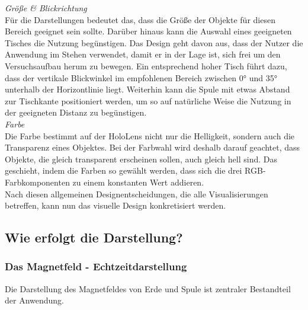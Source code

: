 \textit{Größe \& Blickrichtung}\\
Für die Darstellungen bedeutet das, dass die Größe der Objekte für diesen Bereich geeignet sein sollte. Darüber hinaus kann die Auswahl eines geeigneten Tisches die Nutzung begünstigen. Das Design geht davon aus, dass der Nutzer die Anwendung im Stehen verwendet, damit er in der Lage ist, sich frei um den Versuchsaufbau herum zu bewegen. Ein entsprechend hoher Tisch führt dazu, dass der vertikale Blickwinkel im empfohlenen Bereich zwischen 0° und 35° unterhalb der Horizontlinie liegt. Weiterhin kann die Spule mit etwas Abstand zur Tischkante positioniert werden, um so auf natürliche Weise die Nutzung in der geeigneten Distanz zu begünstigen.\\

\textit{Farbe}\\
Die Farbe bestimmt auf der HoloLens nicht nur die Helligkeit, sondern auch die Transparenz eines Objektes. Bei der Farbwahl wird deshalb darauf geachtet, dass Objekte, die gleich transparent erscheinen sollen, auch gleich hell sind. Das geschieht, indem die Farben so gewählt werden, dass sich die drei RGB-Farbkomponenten zu einem konstanten Wert addieren.\\

Nach diesen allgemeinen Designentscheidungen, die alle Visualisierungen betreffen, kann nun das visuelle Design konkretisiert werden.

\subsection{Wie erfolgt die Darstellung?}

\subsubsection{Das Magnetfeld - Echtzeitdarstellung}
\label{sec-4-2-2}
Die Darstellung des Magnetfeldes von Erde und Spule ist zentraler Bestandteil der Anwendung.

